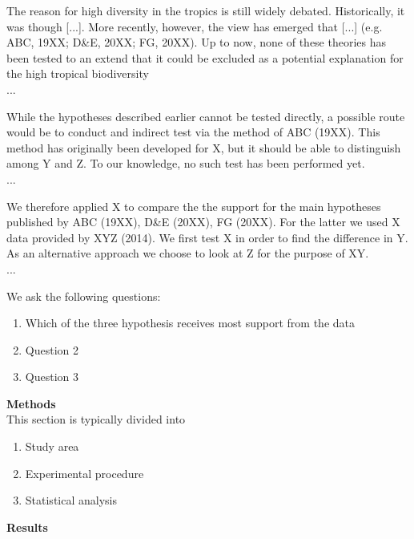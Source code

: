 \documentclass{tufte-book}
\begin{document}
The reason for high diversity in the tropics is still widely debated. Historically, it was though [...]. More recently, however, the view has emerged that [...] (e.g. ABC, 19XX; D\&E, 20XX; FG, 20XX). Up to now, none of these theories has been tested to an extend that it could be excluded as a potential explanation for the high tropical biodiversity\\
...

While the hypotheses described earlier cannot be tested directly, a possible route would be to conduct and indirect test via the method of ABC (19XX). This method has originally been developed for X, but it should be able to distinguish among Y and Z. To our knowledge, no such test has been performed yet.
\\
...

We therefore applied X to compare the the support for the main hypotheses published by ABC (19XX), D\&E (20XX), FG (20XX). For the latter we used X data provided by XYZ (2014). We first test X in order to find the difference in Y. As an alternative approach we choose to look at Z for the purpose of XY.\\
... 

We ask the following questions:

\begin{enumerate}
\item Which of the three hypothesis receives most support from the data
\item Question 2
\item Question 3
\end{enumerate}

\noindent\textbf{Methods}\\

This section is typically divided into

\begin{enumerate}
\item Study area
\item Experimental procedure
\item Statistical analysis
\end{enumerate}

\noindent\textbf{Results}\\
\end{document}
